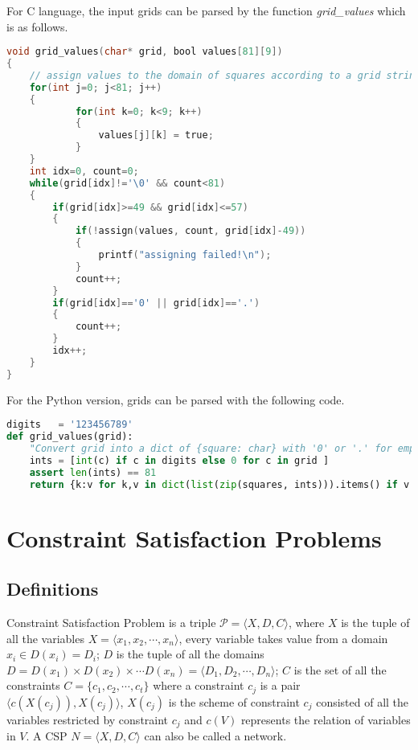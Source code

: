\documentclass[a4paper, 12pt]{report}
\begin{document}
            For C language, the input grids can be parsed by the function \emph{grid\_values} which is as follows.
            \begin{lstlisting}[frame=single, language=C]
void grid_values(char* grid, bool values[81][9])
{
    // assign values to the domain of squares according to a grid string
    for(int j=0; j<81; j++)
    {
            for(int k=0; k<9; k++)
            {
                values[j][k] = true;
            }
    }
    int idx=0, count=0;
    while(grid[idx]!='\0' && count<81)
    {
        if(grid[idx]>=49 && grid[idx]<=57)
        {
            if(!assign(values, count, grid[idx]-49))
            {
                printf("assigning failed!\n");
            }
            count++;
        }
        if(grid[idx]=='0' || grid[idx]=='.')
        {
            count++;
        }
        idx++;
    }
}
            \end{lstlisting}

            For the Python version, grids can be parsed with the following code.

            \begin{lstlisting}[frame=single, language=python]
digits   = '123456789'
def grid_values(grid):
    "Convert grid into a dict of {square: char} with '0' or '.' for empties."
    ints = [int(c) if c in digits else 0 for c in grid ]
    assert len(ints) == 81
    return {k:v for k,v in dict(list(zip(squares, ints))).items() if v!=0}
            \end{lstlisting}


    
    \section {Constraint Satisfaction Problems}

        \subsection {Definitions}
            Constraint Satisfaction Problem is a triple $\mathcal P=\langle X, D, C\rangle$, where $X$ is the tuple of all the variables $X=\langle x_1,x_2,\cdots,x_n\rangle$, every variable takes value from a domain $x_i\in D(x_i)=D_i$; $D$ is the tuple of all the domains $D=D(x_1)\times D(x_2)\times \cdots D(x_n)=\langle D_1,D_2,\cdots,D_n\rangle$; $C$ is the set of all the constraints $C=\{c_1,c_2,\cdots,c_t\}$ where a constraint $c_j$ is a pair $\langle c(X(c_j)),
            X(c_j)\rangle$, $X(c_j)$ is the scheme of constraint $c_j$ consisted of all the variables restricted by constraint $c_j$ and $c(V)$ represents the relation of variables in $V$. A CSP $N=\langle X,D,C\rangle$ can also be called a network.
\end{document}
